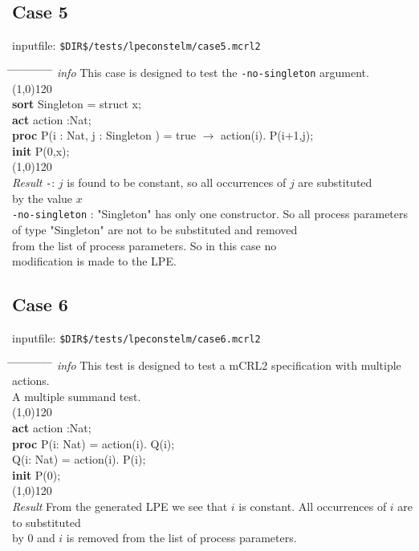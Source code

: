 \index{}\documentclass[a4paper,10pt]{article}
\theoremstyle{plain}
\theoremstyle{definition}
\newcommand{\pps}{process parameters}
\newcommand{\ti}{\textit}
\newcommand{\tb}{\textbf}
\newcommand{\tabw}{\hspace*{15.mm} \= \hspace*{20.mm} \= \hspace*{5.mm} \= \hspace*{5.mm} \= \hspace*{5.mm} \= \hspace*{5.mm}  \= \hspace*{5.mm}  \= \hspace*{5.mm}  \= \hspace*{5.mm} \= \hspace*{5.mm} \= \hspace*{5.mm}  \= \hspace*{5.mm}  \= \hspace*{5.mm}\kill}
\begin{document}
\subsection*{Case 5}
inputfile: \verb"$DIR$/tests/lpeconstelm/case5.mcrl2"
\begin{tabbing}
\tabw
\ti{info} \> This case is designed to test the \verb"-no-singleton" argument. \\
\line(1,0){120}\\
\tb{sort} \> Singleton = struct x; \\
\tb{act}  \> action :Nat; \\
\tb{proc} \>  P(i : Nat, j : Singleton ) = true $\rightarrow$ action(i). P(i+1,j); \\
\tb{init} \>  P(0,x); \\
\line(1,0){120}\\
\ti{Result} \> 
\verb"-": \> \> $j$ is found to be constant, so all occurrences of $j$ are substituted  \\
\> \> \> by the value $x$\\
\> \verb"-no-singleton" : \> \> "Singleton" has only one constructor. So all \pps\  \\
\> \> \>                       of type "Singleton" are not to be substituted and removed  \\
\> \> \>                       from the list of \pps . So in this case no  \\
\> \> \>                       modification is made to the LPE.
\end{tabbing}
\newpage
\subsection*{Case 6}
inputfile: \verb"$DIR$/tests/lpeconstelm/case6.mcrl2"
\begin{tabbing}
\tabw
\ti{info} \> This test is designed to test a mCRL2 specification with multiple actions. \\
          \> A multiple summand test. \\
\line(1,0){120}\\
\tb{act} \> action :Nat;\\
\tb{proc} \> P(i: Nat) = \>  action(i). Q(i);\\
     \> Q(i: Nat) = \>  action(i). P(i);\\

\tb{init} \> P(0);\\
\line(1,0){120}\\
\ti{Result} \> From the generated LPE we see that $i$ is constant. All occurrences of $i$ are to substituted \\
 \> by 0 and $i$ is removed from the list of \pps .
\end{tabbing}
\end{document}
